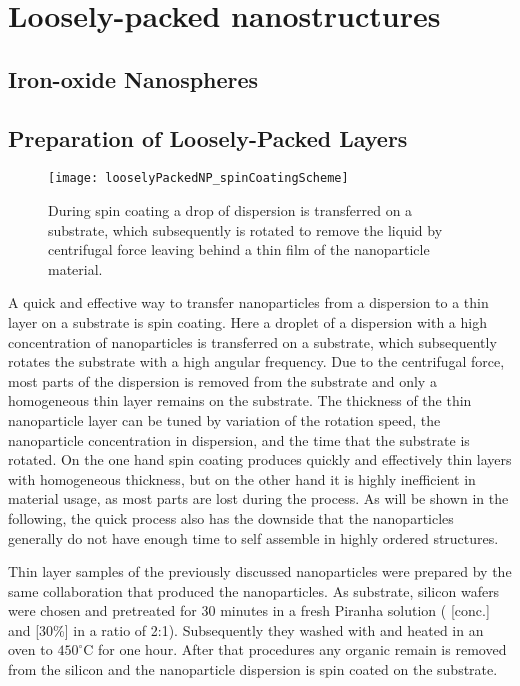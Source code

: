 \documentclass[\main/dresen_thesis.tex]{subfiles}
\renewcommand{\thisPath}{\main/chapters/looselyPackedNS}
\begin{document}
  \chapter{Loosely-packed nanostructures}\label{ch:looselyPackedNS}

    \section{Iron-oxide Nanospheres}
      

    \section{Preparation of Loosely-Packed Layers}
      \begin{figure}[tb]
        \centering
        \texttt{[image: looselyPackedNP\_spinCoatingScheme]}
        \caption{\label{fig:looselyPackedNP:preparation:spinCoatingScheme}During spin coating a drop of dispersion is transferred on a substrate, which subsequently is rotated to remove the liquid by centrifugal force leaving behind a thin film of the nanoparticle material.}
      \end{figure}

      A quick and effective way to transfer nanoparticles from a dispersion to a thin layer on a substrate is spin coating.
      Here a droplet of a dispersion with a high concentration of nanoparticles is transferred on a substrate, which subsequently rotates the substrate with a high angular frequency.
      Due to the centrifugal force, most parts of the dispersion is removed from the substrate and only a homogeneous thin layer remains on the substrate.
      The thickness of the thin nanoparticle layer can be tuned by variation of the rotation speed, the nanoparticle concentration in dispersion, and the time that the substrate is rotated.
      On the one hand spin coating produces quickly and effectively thin layers with homogeneous thickness, but on the other hand it is highly inefficient in material usage, as most parts are lost during the process.
      As will be shown in the following, the quick process also has the downside that the nanoparticles generally do not have enough time to self assemble in highly ordered structures.

      Thin layer samples of the previously discussed nanoparticles were prepared by the same collaboration that produced the nanoparticles.
      As substrate, silicon wafers were chosen and pretreated for 30 minutes in a fresh Piranha solution ( [conc.] and  [30\%] in a ratio of 2:1). Subsequently they washed with  and heated in an oven to $450 ^\circ \mathrm{C}$ for one hour.
      After that procedures any organic remain is removed from the silicon and the nanoparticle dispersion is spin coated on the substrate.
\end{document}
